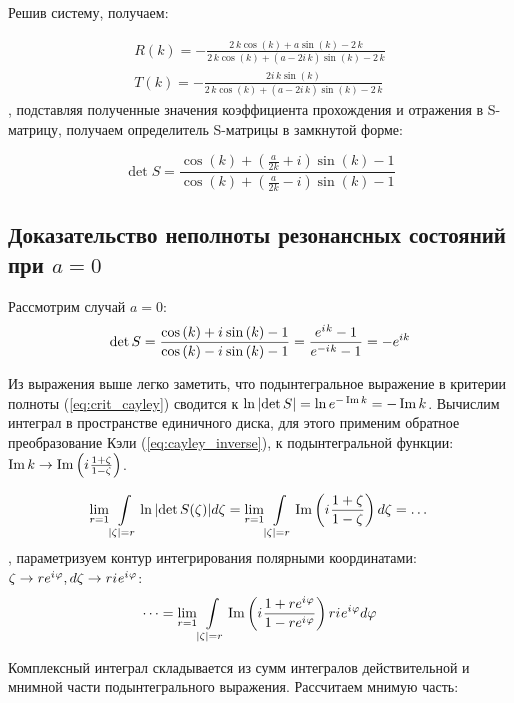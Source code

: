 Решив систему, получаем:

\begin{align*}
R(k) = -\frac{2 \, k \cos\left(k\right) + a \sin\left(k\right) - 2 \, k}{2 \, k \cos\left(k\right) + {\left(a - 2 i \, k\right)} \sin\left(k\right) - 2 \, k} \\
T(k) = -\frac{2 i \, k \sin\left(k\right)}{2 \, k \cos\left(k\right) + {\left(a - 2 i \, k\right)} \sin\left(k\right) - 2 \, k}
\end{align*}
, подставляя полученные значения коэффициента прохождения и отражения в S-матрицу, получаем определитель S-матрицы в замкнутой форме:

\begin{equation}\label{eq:ring_detS}
\det S = 
\frac
{\cos\left(k\right) + {\left(\frac{a}{2 k} + i\right)} \sin\left(k\right) - 1}
{\cos\left(k\right) + {\left(\frac{a}{2 k} - i\right)} \sin\left(k\right) - 1}
\end{equation}


\subsection{Доказательство неполноты резонансных состояний при $a=0$}
Рассмотрим случай $a=0$:
\[
\det S
= \frac
{\cos\left(k\right) + {i\mkern1mu} \sin\left(k\right) - 1}
{\cos\left(k\right) - {i\mkern1mu} \sin\left(k\right) - 1}
= \frac{e^{{i\mkern1mu} k} - 1}{e^{-{i\mkern1mu} k} - 1}
= -e^{i k}
\]

Из выражения выше легко заметить, что подынтегральное выражение в критерии полноты (\ref{eq:crit_cayley}) сводится к $\ln \abs{\det S} = \ln e^{- \operatorname{Im} k} = -\operatorname{Im} k$. Вычислим интеграл в пространстве единичного диска, для этого применим обратное преобразование Кэли (\ref{eq:cayley_inverse}), к подынтегральной функции: $\operatorname{Im} k \to \operatorname{Im} \left( {i\mkern1mu} \frac{1 + \zeta}{1 - \zeta} \right) $.

\[
  \lim\limits_{r = 1} \int\limits_{\abs{\zeta} = r} \ln \abs{\det S(\zeta)} d \zeta
= \lim\limits_{r = 1} \int\limits_{\abs{\zeta} = r} \operatorname{Im} \left( {i\mkern1mu} \frac{1 + \zeta}{1 - \zeta} \right)  d\zeta = \dots
\]
, параметризуем контур интегрирования полярными координатами: $\zeta \to r e^{{i\mkern1mu} \varphi}, d\zeta \to r {i\mkern1mu} e^{{i\mkern1mu} \varphi}$:
\[
\dots = \lim\limits_{r = 1} \int\limits_{\abs{\zeta} = r} \operatorname{Im} \left( {i\mkern1mu} \frac{1 + r e^{{i\mkern1mu} \varphi}}{1 - r e^{{i\mkern1mu} \varphi}} \right) r {i\mkern1mu} e^{{i\mkern1mu} \varphi} d\varphi
\]

Комплексный интеграл складывается из сумм интегралов действительной и мнимной части подынтегрального выражения. Рассчитаем мнимую часть:

